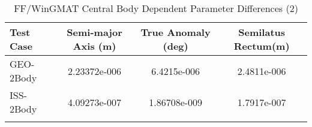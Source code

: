 \begin{table}[htbp!]
\centering
\caption{ FF/WinGMAT Central Body Dependent Parameter Differences (2)}
      \begin{tabular}{lccc}
      \hline\hline
          Test Case & Semi-major Axis (m) & True Anomaly (deg) & Semilatus Rectum(m) \\
         \hline
         GEO-2Body & 2.23372e-006 & 6.4215e-006 & 2.4811e-006 \\
         ISS-2Body & 4.09273e-007 & 1.86708e-009 & 1.7917e-007 \\
      \hline\hline
      \label{Table: FF-WinGMAT CB Parameters Set 2} 
\end{tabular}
\end{table}
